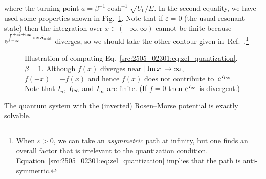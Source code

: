 where the turning point $a=\beta^{-1}\cosh^{-1}\sqrt{U_0/E}$.
In the second equality, we have used some properties shown in Fig.~\ref{src:2505_02301:fig:zel_integration}.
Note that if $\varepsilon=0$ (the usual resonant state) then the integration over $x\in(-\infty,\infty)$ cannot be finite because $\mathrm{e}^{\int_{\pm\infty}^{\pm\infty\pm \mathrm{i} \infty}\mathrm{d} x\, S_{\mathrm{odd}}}$ diverges, so we should take the other contour given in~Ref.~\cite{Morikawa:2025grx}.\footnote{When $\varepsilon>0$, we can take an \textit{asymmetric} path at infinity, but one finds an overall factor that is irrelevant to the quantization condition. Equation~\eqref{src:2505_02301:eq:zel_quantization} implies that the path is anti-symmetric.}
\begin{figure}
    \centering
{}
    \caption{Illustration of computing Eq.~\eqref{src:2505_02301:eq:zel_quantization}. $\beta=1$. Although $f(x)$ diverges near $|\operatorname{Im} x|\to\infty$, $f(-x)=-f(x)$ and hence $f(x)$ does not contribute to~$\mathrm{e}^{I_{\mathrm{i} \infty}}$.
    Note that $I_n$, $I_{\mathrm{i} \infty}$ and $I_\infty$ are finite.
    (If $f=0$ then $\mathrm{e}^{I_\infty}$ is divergent.)}
    \label{src:2505_02301:fig:zel_integration}
\end{figure}
The quantum system with the (inverted) Rosen--Morse potential is exactly solvable.
